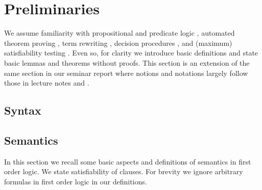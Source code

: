 
\chapter{Preliminaries}



We assume familiarity with propositional and predicate logic \cite{Huth:2004:LCS:975331}, 
automated theorem proving \cite{Fitting:1996:FLA:230183}, 
term rewriting \cite{Baader:1998:TR:280474}, 
decision procedures \cite{Kroening:2008:DPA:1391237}, 
and (maximum) satisfiability testing \cite{Biere:2009:HSV:1550723}.
Even so, for clarity we introduce basic
definitions and state basic lemmas and theorems without proofs.
This section is an extension of the same section in our seminar report \cite{axm:SR2}
where notions and notations largely follow those in lecture notes \cite{AM2015tr} and \cite{GM2013ar}.


\section{Syntax}

















\section{Semantics}

In this section we recall some basic aspects and definitions of semantics in first order logic. 
We state satisfiability of clauses. For brevity we ignore arbitrary formulas in first order logic
in our definitions.


